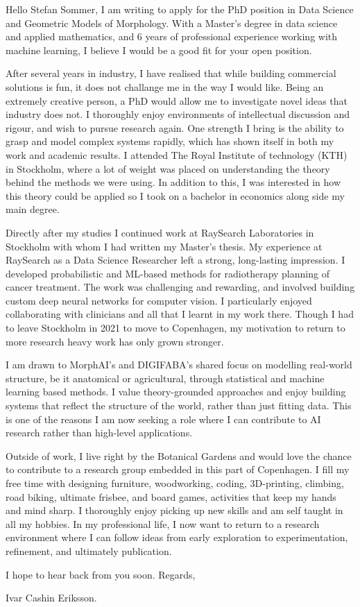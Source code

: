 \documentclass[11pt,a4paper]{moderncv}
\begin{document}
\makecvtitle
Hello Stefan Sommer, I am writing to apply for the PhD position in Data Science and Geometric Models of Morphology. With a Master's degree in data science and applied mathematics, and 6 years of professional experience working with machine learning, I believe I would be a good fit for your open position.

\hspace*{2em}
After several years in industry, I have realised that while building commercial solutions is fun, it does not challange me in the way I would like. Being an extremely creative person, a PhD would allow me to investigate novel ideas that industry does not. I thoroughly enjoy environments of intellectual discussion and rigour, and wish to pursue research again. One strength I bring is the ability to grasp and model complex systems rapidly, which has shown itself in both my work and academic results. I attended The Royal Institute of technology (KTH) in Stockholm, where a lot of weight was placed on understanding the theory behind the methods we were using. In addition to this, I was interested in how this theory could be applied so I took on a bachelor in economics along side my main degree.

\hspace*{2em}
Directly after my studies I continued work at RaySearch Laboratories in Stockholm with whom I had written my Master's thesis. My experience at RaySearch as a Data Science Researcher left a strong, long-lasting impression. I developed probabilistic and ML-based methods for radiotherapy planning of cancer treatment. The work was challenging and rewarding, and involved building custom deep neural networks for computer vision. I particularly enjoyed collaborating with clinicians and all that I learnt in my work there. Though I had to leave Stockholm in 2021 to move to Copenhagen, my motivation to return to more research heavy work has only grown stronger. 

\hspace*{2em}
I am drawn to MorphAI's and DIGIFABA's shared focus on modelling real-world structure, be it anatomical or agricultural, through statistical and machine learning based methods. I value theory-grounded approaches and enjoy building systems that reflect the structure of the world, rather than just fitting data. This is one of the reasons I am now seeking a role where I can contribute to AI research rather than high-level applications.

\hspace*{2em}
Outside of work, I live right by the Botanical Gardens and would love the chance to contribute to a research group embedded in this part of Copenhagen. I fill my free time with designing furniture, woodworking,  coding, 3D-printing, climbing, road biking, ultimate frisbee, and board games, activities that keep my hands and mind sharp. I thoroughly enjoy picking up new skills and am self taught in all my hobbies. In my professional life, I now want to return to a research environment where I can follow ideas from early exploration to experimentation, refinement, and ultimately publication.

\vspace{8 mm}
I hope to hear back from you soon. Regards, 

\vspace{3 mm} 
Ivar Cashin Eriksson.
\end{document}
